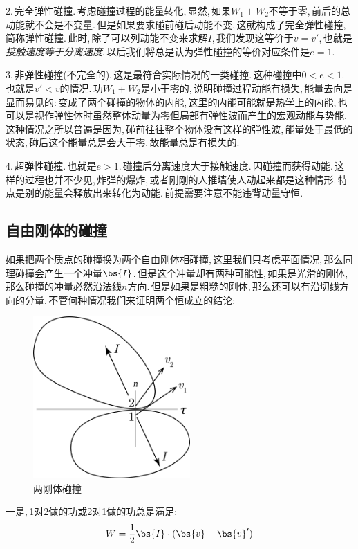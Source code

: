 2.\,完全弹性碰撞.\,考虑碰撞过程的能量转化,\,显然,\,如果$W_1+W_2$不等于零,\,前后的总动能就不会是不变量.\,但是如果要求碰前碰后动能不变,\,这就构成了完全弹性碰撞,\,简称弹性碰撞.\,此时,\,除了可以列动能不变来求解$I$,\,我们发现这等价于$v=v'$,\,也就是\emph{接触速度等于分离速度}.\,以后我们将总是认为弹性碰撞的等价对应条件是$e=1$.

3.\,非弹性碰撞(不完全的).\,这是最符合实际情况的一类碰撞.\,这种碰撞中$0<e<1$.\,也就是$v'<v$的情况.\,功$W_1+W_2$是小于零的,\,说明碰撞过程动能有损失,\,能量去向是显而易见的:\,变成了两个碰撞的物体的内能,\,这里的内能可能就是热学上的内能,\,也可以是视作弹性体时虽然整体动量为零但局部有弹性波而产生的宏观动能与势能.\,这种情况之所以普遍是因为,\,碰前往往整个物体没有这样的弹性波,\,能量处于最低的状态,\,碰后这个能量总是会大于零.\,故能量总是有损失的.

4.\,超弹性碰撞.\,也就是$e>1$.\,碰撞后分离速度大于接触速度.\,因碰撞而获得动能.\,这样的过程也并不少见,\,炸弹的爆炸,\,或者刚刚的人推墙使人动起来都是这种情形.\,特点是别的能量会释放出来转化为动能.\,前提需要注意不能违背动量守恒.





\subsection{自由刚体的碰撞}

如果把两个质点的碰撞换为两个自由刚体相碰撞,\,这里我们只考虑平面情况,\,那么同理碰撞会产生一个冲量$\bs{I}$.\,但是这个冲量却有两种可能性,\,如果是光滑的刚体,\,那么碰撞的冲量必然沿法线$n$方向.\,但是如果是粗糙的刚体,\,那么还可以有沿切线方向的分量.\,不管何种情况我们来证明两个恒成立的结论:
\begin{figure}\label{6-1-12}
\centering
\includegraphics[width=6cm]{image/6-1-13.png}
\caption{两刚体碰撞}
\end{figure}

一是,\,1对2做的功或2对1做的功总是满足:
\[W=\frac{1}{2}\bs{I}\cdot(\bs{v}+\bs{v}')\]

